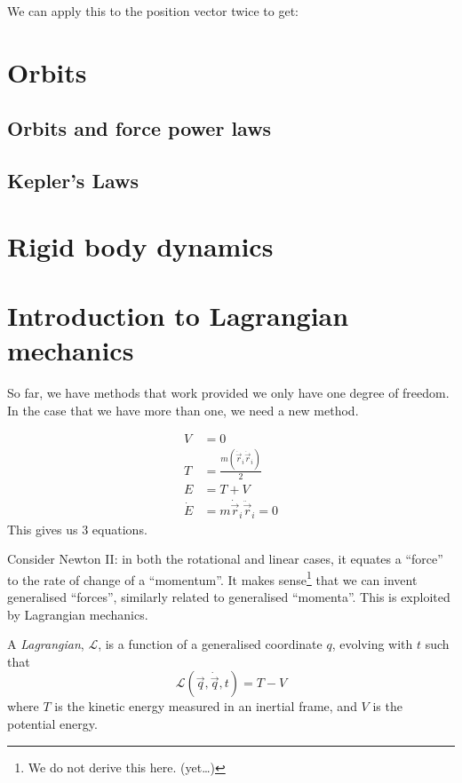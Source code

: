 \documentclass[a4paper]{article}
\begin{document}
We can apply this to the position vector twice to get:





\section{Orbits}\label{sec:orbits}
\subsection{Orbits and force power laws}
\subsection{Kepler's Laws}
\section{Rigid body dynamics}\label{sec:rigid-body-dynamics}
\section{Introduction to Lagrangian mechanics}\label{sec:introduction-to-lagrangian-mechanics}
So far, we have methods that work provided we only have one degree of freedom. In the case that we have more than one, we need a new method.
\begin{eg}
  \begin{align*}
    V &= 0 \\
    T &= \frac{m (\dot{\vec{r}}_i \dot{\vec{r}}_i)}{2} \\
    E &= T + V \\
    \dot{E} &= m \dot{\vec{r}}_i \ddot{\vec{r}}_i = 0
  \end{align*}
  This gives us 3 equations.
\end{eg}

Consider Newton II: in both the rotational and linear cases, it equates a ``force'' to the rate of change of a ``momentum''. It makes sense\footnote{We do not derive this here. (yet\dots)} that we can invent generalised ``forces'', similarly related to generalised ``momenta''. This is exploited by Lagrangian mechanics.

\begin{defi}[Lagrangian]
  A \emph{Lagrangian}, $\mathcal{L}$, is a function of a generalised coordinate $q$, evolving with $t$ such that
  $$\mathcal{L}(\vec{q}, \dot{\vec{q}}, t) = T - V$$
  where $T$ is the kinetic energy measured in an inertial frame, and $V$ is the potential energy.
\end{defi}
\end{document}
